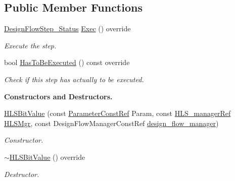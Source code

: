\subsection*{Public Member Functions}
\begin{DoxyCompactItemize}
\item 
\hyperlink{design__flow__step_8hpp_afb1f0d73069c26076b8d31dbc8ebecdf}{Design\+Flow\+Step\+\_\+\+Status} \hyperlink{classHLSBitValue_aa12a409aacf4e6eef2e5ab063923b572}{Exec} () override
\begin{DoxyCompactList}\small\item\em Execute the step. \end{DoxyCompactList}\item 
bool \hyperlink{classHLSBitValue_a49f19f5709798c91fa14970e17ca26a3}{Has\+To\+Be\+Executed} () const override
\begin{DoxyCompactList}\small\item\em Check if this step has actually to be executed. \end{DoxyCompactList}\end{DoxyCompactItemize}
\begin{Indent}\textbf{ Constructors and Destructors.}\par
\begin{DoxyCompactItemize}
\item 
\hyperlink{classHLSBitValue_a0953a769ebaf47a3961793524a3ad928}{H\+L\+S\+Bit\+Value} (const \hyperlink{Parameter_8hpp_a37841774a6fcb479b597fdf8955eb4ea}{Parameter\+Const\+Ref} Param, const \hyperlink{hls__manager_8hpp_acd3842b8589fe52c08fc0b2fcc813bfe}{H\+L\+S\+\_\+manager\+Ref} \hyperlink{classHLS__step_ade85003a99d34134418451ddc46a18e9}{H\+L\+S\+Mgr}, const Design\+Flow\+Manager\+Const\+Ref \hyperlink{classDesignFlowStep_ab770677ddf087613add30024e16a5554}{design\+\_\+flow\+\_\+manager})
\begin{DoxyCompactList}\small\item\em Constructor. \end{DoxyCompactList}\item 
\hyperlink{classHLSBitValue_a56220c807963ea620be92b52375cb94f}{$\sim$\+H\+L\+S\+Bit\+Value} () override
\begin{DoxyCompactList}\small\item\em Destructor. \end{DoxyCompactList}\end{DoxyCompactItemize}
\end{Indent}
